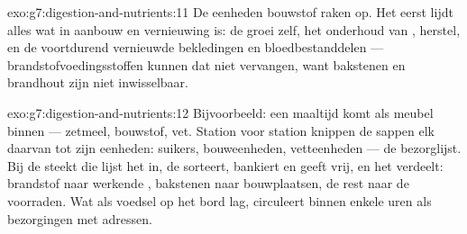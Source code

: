 \begin{solution}{exo:g7:digestion-and-nutrients:11}
De eenheden bouwstof raken op. Het eerst lijdt alles wat in aanbouw en
vernieuwing is: de groei zelf, het onderhoud van , herstel, en de
voortdurend vernieuwde bekledingen en bloedbestanddelen ---
brandstofvoedingsstoffen kunnen dat niet vervangen, want bakstenen en
brandhout zijn niet inwisselbaar.
\end{solution}

\begin{solution}{exo:g7:digestion-and-nutrients:12}
Bijvoorbeeld: een maaltijd komt als meubel binnen --- zetmeel, bouwstof,
vet. Station voor station knippen de sappen elk daarvan tot zijn eenheden:
suikers, bouweenheden, vetteenheden --- de bezorglijst. Bij de 
steekt die lijst het  in, de  sorteert, bankiert en geeft vrij,
en het  verdeelt: brandstof naar werkende , bakstenen naar
bouwplaatsen, de rest naar de voorraden. Wat als voedsel op het bord lag,
circuleert binnen enkele uren als bezorgingen met adressen.
\end{solution}


